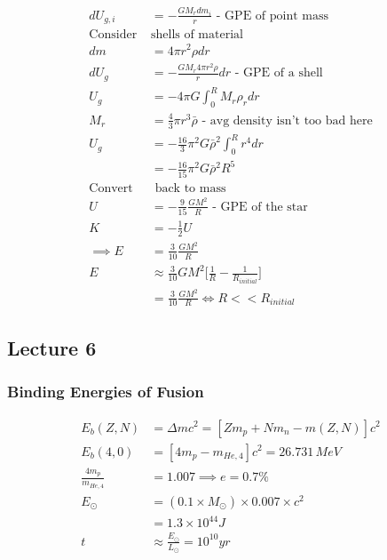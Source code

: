 \documentclass[a4paper,11pt,normalem]{article}
\begin{document}
\[
    \begin{aligned}
        dU_{g,i} &= -\frac{GM_{r}dm_{i}}{r} \text{ - GPE of point mass} \\
        \text{Consider }& \text{shells of material} \\
        dm &= 4\pi r^2 \rho dr \\
        dU_{g} &= -\frac{GM_r 4\pi r^2 \rho}{r}dr \text{ - GPE of a shell} \\
        U_g &= -4\pi G \int_{0}^{R} M_r \rho_r dr \\
        M_r &= \frac{4}{3}\pi r^3 \bar{\rho} \text{ - avg density isn't too bad here} \\
        U_g &= -\frac{16}{3}\pi^2 G\bar{\rho}^2 \int_{0}^{R} r^4 dr \\
        &= -\frac{16}{15}\pi^2 G\bar{\rho}^2 R^5 \\
        \text{Convert} &\text{ back to mass} \\
        U &= -\frac{9}{15}\frac{GM^2}{R} \text{ - GPE of the star} \\
        K &= -\frac{1}{2} U \\
        \implies E &= \frac{3}{10}\frac{GM^2}{R} \\
        E &\approx \frac{3}{10} GM^2 \Big[\frac{1}{R} - \frac{1}{R_{initial}}\Big] \\
        &= \frac{3}{10}\frac{GM^2}{R} \iff R << R_{initial}
    \end{aligned}
\]

\subsection{Lecture 6}\label{lecture-6}

\subsubsection{Binding Energies of
Fusion}\label{binding-energies-of-fusion}

\[
    \begin{aligned}
    E_b(Z,N) &= \Delta mc^2 = [Zm_p + Nm_n - m(Z, N)]c^2 \\
    E_b(4,0) &= [4m_p - m_{He,4}]c^2 = 26.731\,MeV \\
    \frac{4m_p}{m_{He,4}} &= 1.007 \implies  e = 0.7\% \\
    E_{\odot} &= (0.1\times M_\odot)\times0.007\times c^2  \\
    &= 1.3\times10^{44}J \\
    t &\approx \frac{E_\odot}{L_\odot} = 10^{10}yr
    \end{aligned}
\]
\end{document}
